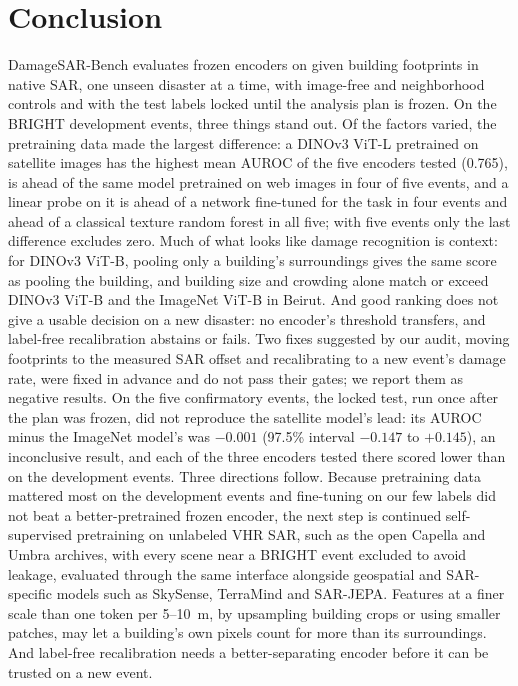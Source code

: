 \documentclass[journal]{IEEEtran}
\begin{document}
\section{Conclusion}
\label{sec:conclusion}
DamageSAR-Bench evaluates frozen encoders on given building footprints in native SAR, one unseen disaster at a time, with image-free and neighborhood controls and with the test labels locked until the analysis plan is frozen. On the BRIGHT development events, three things stand out. Of the factors varied, the pretraining data made the largest difference: a DINOv3 ViT-L pretrained on satellite images has the highest mean AUROC of the five encoders tested (0.765), is ahead of the same model pretrained on web images in four of five events, and a linear probe on it is ahead of a network fine-tuned for the task in four events and ahead of a classical texture random forest in all five; with five events only the last difference excludes zero. Much of what looks like damage recognition is context: for DINOv3 ViT-B, pooling only a building's surroundings gives the same score as pooling the building, and building size and crowding alone match or exceed DINOv3 ViT-B and the ImageNet ViT-B in Beirut. And good ranking does not give a usable decision on a new disaster: no encoder's threshold transfers, and label-free recalibration abstains or fails. Two fixes suggested by our audit, moving footprints to the measured SAR offset and recalibrating to a new event's damage rate, were fixed in advance and do not pass their gates; we report them as negative results. On the five confirmatory events, the locked test, run once after the plan was frozen, did not reproduce the satellite model's lead: its AUROC minus the ImageNet model's was $-0.001$ (97.5\% interval $-0.147$ to $+0.145$), an inconclusive result, and each of the three encoders tested there scored lower than on the development events. Three directions follow. Because pretraining data mattered most on the development events and fine-tuning on our few labels did not beat a better-pretrained frozen encoder, the next step is continued self-supervised pretraining on unlabeled VHR SAR, such as the open Capella and Umbra archives, with every scene near a BRIGHT event excluded to avoid leakage, evaluated through the same interface alongside geospatial and SAR-specific models such as SkySense, TerraMind and SAR-JEPA. Features at a finer scale than one token per 5--10~m, by upsampling building crops or using smaller patches, may let a building's own pixels count for more than its surroundings. And label-free recalibration needs a better-separating encoder before it can be trusted on a new event.
\end{document}
